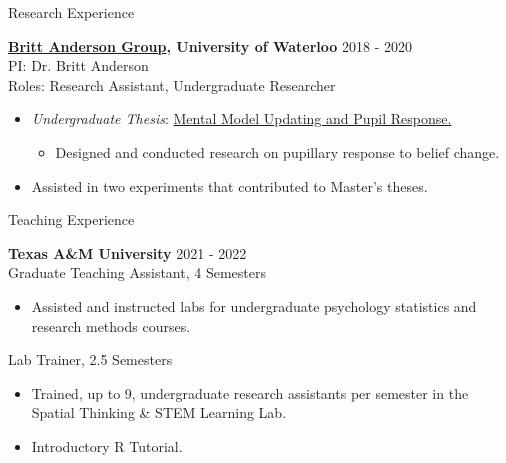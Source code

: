 \documentclass{resume} %
\begin{document}
\begin{rSection}{Research Experience}
\begin{itemize}[nosep]
    \end{itemize}
    
    {\bf \href{https://brittlab.uwaterloo.ca/}{Britt Anderson Group}, 
        University of Waterloo}
    \hfill {2018 - 2020}
    \\PI: Dr. Britt Anderson
    \\Roles: Research Assistant, Undergraduate Researcher
    
    \begin{itemize}[nosep]
        
        \item \emph{Undergraduate Thesis}: 
        \href{https://github.com/sjp117/Undergrad_Projects/tree/master/mentalModelUpdatingPupil}{Mental
         Model Updating and Pupil Response.}
            \begin{itemize}
                \item Designed and conducted research on pupillary response to 
                belief change.
            \end{itemize}
        \item Assisted in two experiments that contributed to Master's theses.
        
    \end{itemize}
    
\end{rSection}


\begin{rSection}{Teaching Experience}
    
    {\bf {Texas A\&M University}}
    \hfill {2021 - 2022}
    \\Graduate Teaching Assistant, 4 Semesters
    
    \begin{itemize}[nosep]
        
        \item Assisted and instructed labs for undergraduate psychology 
        statistics and research methods courses.
        
    \end{itemize}

    Lab Trainer, 2.5 Semesters
    
    \begin{itemize}[nosep]
        
        \item Trained, up to 9, undergraduate research assistants per 
        semester in the Spatial Thinking \& STEM Learning Lab.
        \item Introductory R Tutorial.
        
    \end{itemize}
    
\end{rSection}
\end{document}
